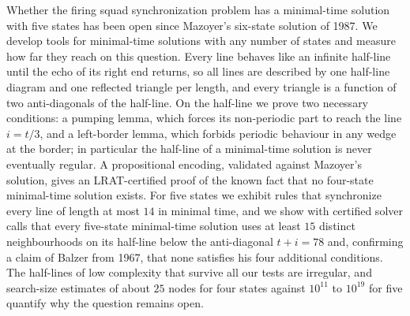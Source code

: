 Whether the firing squad synchronization problem has a minimal-time
solution with five states has been open since Mazoyer's six-state solution
of 1987. We develop tools for minimal-time solutions with any number of
states and measure how far they reach on this question. Every line behaves
like an infinite half-line until the echo of its right end returns, so all
lines are described by one half-line diagram and one reflected triangle per
length, and every triangle is a function of two anti-diagonals of the
half-line.
On the half-line we prove two necessary conditions: a pumping lemma, which
forces its non-periodic part to reach the line $i=t/3$, and a left-border
lemma, which forbids periodic behaviour in any wedge at the border; in
particular the half-line of a minimal-time solution is never eventually
regular. A propositional encoding, validated against Mazoyer's solution,
gives an LRAT-certified proof of the known fact that no four-state
minimal-time solution exists. For five states we exhibit rules that
synchronize every line of length at most $14$ in minimal time, and we show
with certified solver calls that every five-state minimal-time solution
uses at least $15$ distinct neighbourhoods on its half-line below the
anti-diagonal $t+i=78$ and, confirming a claim of Balzer from 1967, that none
satisfies his four additional conditions. The half-lines of low complexity that survive all
our tests are irregular, and search-size estimates of about $25$ nodes for
four states against $10^{11}$ to $10^{19}$ for five quantify why the question
remains open.
